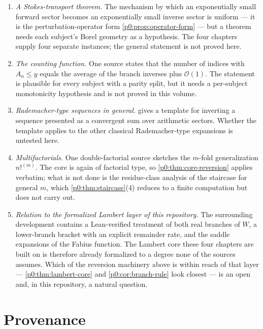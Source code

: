 \documentclass[11pt,a4paper,oneside]{book}
\theoremstyle{plain}
\theoremstyle{definition}
\theoremstyle{remark}
\newcommand{\bigO}{\mathcal{O}}
\newcommand{\Wlam}{W}
\begin{document}
\begin{enumerate}[label=(\roman*),leftmargin=*]
\item \emph{A Stokes-transport theorem.}  The mechanism by which an
      exponentially small forward sector becomes an exponentially small
      inverse sector is uniform --- it is the perturbation-operator form
      \cref{p0:prop:operator-form} --- but a theorem needs each subject's
      Borel geometry as a hypothesis.  The four chapters supply four separate
      instances; the general statement is not proved here.
\item \emph{The counting function.}  One source states that the number of
      indices with $A_n\le y$ equals the average of the branch inverses plus
      $\bigO(1)$.  The statement is plausible for every subject with a parity
      split, but it needs a per-subject monotonicity hypothesis and is not
      proved in this volume.
\item \emph{Rademacher-type sequences in general.}   gives a
      template for inverting a sequence presented as a convergent sum over
      arithmetic sectors.  Whether the template applies to the other classical
      Rademacher-type expansions is untested here.
\item \emph{Multifactorials.}  One double-factorial source sketches the
      $m$-fold generalization $n!^{(m)}$.  The core is again of factorial
      type, so \cref{p0:thm:core-reversion} applies verbatim; what is not done
      is the residue-class analysis of the staircase for general $m$, which
      \cref{p0:thm:staircase}(4) reduces to a finite computation but does not
      carry out.
\item \emph{Relation to the formalized Lambert layer of this repository.}  The
      surrounding development contains a Lean-verified treatment of both real
      branches of $\Wlam$, a lower-branch bracket with an explicit remainder
      rate, and the saddle expansions of the Fabius function.  The Lambert
      core these four chapters are built on is therefore already formalized to
      a degree none of the sources assumes.  Which of the reversion machinery
      above is within reach of that layer --- \cref{p0:thm:lambert-core} and
      \cref{p0:cor:branch-rule} look closest --- is an open and, in this
      repository, a natural question.
\end{enumerate}

\appendix

\chapter{Provenance}\label{app:provenance}
\end{document}
